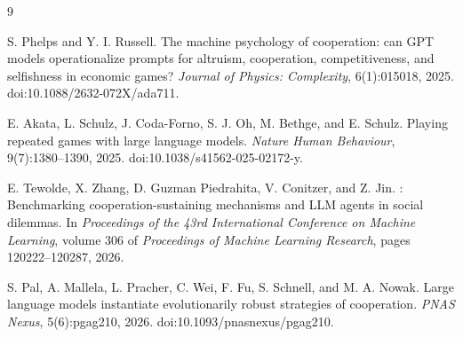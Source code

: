 \documentclass[11pt]{article}
\begin{document}
\begin{thebibliography}{9}

S. Phelps and Y. I. Russell.
\newblock The machine psychology of cooperation: can {\sc GPT} models operationalize prompts for altruism, cooperation, competitiveness, and selfishness in economic games?
\newblock \emph{Journal of Physics: Complexity}, 6(1):015018, 2025.
\newblock doi:10.1088/2632-072X/ada711.

E. Akata, L. Schulz, J. Coda-Forno, S. J. Oh, M. Bethge, and E. Schulz.
\newblock Playing repeated games with large language models.
\newblock \emph{Nature Human Behaviour}, 9(7):1380--1390, 2025.
\newblock doi:10.1038/s41562-025-02172-y.

E. Tewolde, X. Zhang, D. Guzman Piedrahita, V. Conitzer, and Z. Jin.
: Benchmarking cooperation-sustaining mechanisms and {\sc LLM} agents in social dilemmas.
\newblock In \emph{Proceedings of the 43rd International Conference on Machine Learning}, volume 306 of \emph{Proceedings of Machine Learning Research}, pages 120222--120287, 2026.

S. Pal, A. Mallela, L. Pracher, C. Wei, F. Fu, S. Schnell, and M. A. Nowak.
\newblock Large language models instantiate evolutionarily robust strategies of cooperation.
\newblock \emph{PNAS Nexus}, 5(6):pgag210, 2026.
\newblock doi:10.1093/pnasnexus/pgag210.

\end{thebibliography}
\end{document}
